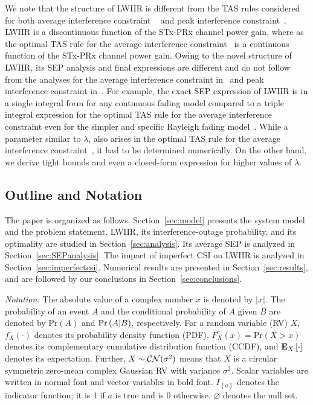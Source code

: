 \documentclass[12pt,draftcls,peerreview,onecolumn]{IEEEtran}
\newcommand{\brac}[1]{\left({#1}\right)}
\newcommand{\cbrac}[1]{\left\{{#1}\right\}}
\newcommand{\indic}[1]{I_{\cbrac{#1}}}
\newcommand{\explow}[2]{{\bf{E}}_{#1}\left[{#2}\right]}
\newcommand{\prob}[1]{\text{Pr}\brac{#1}}
\newcommand{\given}{\arrowvert}
\newcommand{\lam}{\lambda}
\newcommand{\nullset}{\varnothing}
\begin{document}
We note that the structure of LWIIR is different from the TAS rules considered for both average interference constraint ~\cite{Sarvendranath_2013_TCOM,Sarvendranath_2014_TCOM,Wang_2011_TCom} and peak interference constraint~\cite{Wang_2010_TWC,Fakhan_2014_TSP}. LWIIR is a discontinuous function of the STx-PRx channel power gain, where as the optimal TAS rule for the average interference constraint~\cite{Sarvendranath_2013_TCOM} is a continuous function of the STx-PRx channel power gain. Owing to the novel structure of LWIIR, its SEP analysis and final expressions are different and do not follow from the analyses for the average interference constraint in~\cite{Sarvendranath_2013_TCOM} and peak interference constraint in~\cite{Fakhan_2014_TSP}. For example, the exact SEP expression of LWIIR is in a single integral form for any continuous fading model compared to a triple integral expression for the optimal TAS rule for the average interference constraint even for the simpler and specific Rayleigh fading model~\cite{Sarvendranath_2013_TCOM}. While a parameter similar to $\lam$, also arises in the optimal TAS rule for the average interference constraint~\cite{Sarvendranath_2013_TCOM,Wang_2011_TCom}, it had to be determined numerically. On the other hand, we derive tight bounds and even a closed-form expression for higher values of $\lam$.



\subsection{Outline and Notation}
The paper is organized as follows. Section~\ref{sec:model} presents the system model and the problem statement. LWIIR, its interference-outage probability, and its optimality are studied in Section~\ref{sec:analysis}. Its average SEP is analyzed in Section~\ref{sec:SEPanalysis}. The impact of imperfect CSI on LWIIR  is analyzed in Section~\ref{sec:imperfectcsi}. Numerical results are presented in Section~\ref{sec:results}, and are followed by our conclusions in Section~\ref{sec:conclusions}. %

\emph{Notation:} The absolute value of a complex number $x$ is denoted by $|x|$. The probability of an event $A$ and the conditional probability of $A$ given $B$ are denoted by $\prob{A}$ and $\prob{A \given B}$, respectively. For a random variable (RV) $X$, $f_{X}(\cdot)$ denotes its probability density function (PDF), $F_{X}^{c}(x)=\prob{X>x}$ denotes its complementary cumulative distribution function (CCDF), and $\explow{X}{\cdot}$ denotes its expectation. Further, $X \sim {\cal CN}(\sigma^2)$ means that $X$ is a circular symmetric zero-mean complex Gaussian RV with  variance $\sigma^2$.  Scalar variables are written in normal font and vector variables in bold font. $\indic{a}$ denotes the indicator function; it is 1 if $a$ is true and is 0 otherwise. $\nullset$ denotes the null set.
\end{document}
